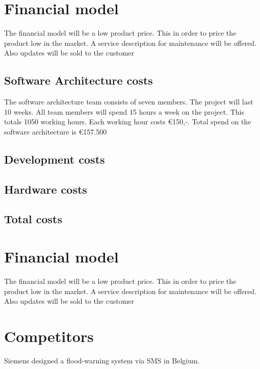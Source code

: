 \section{Financial model}
The financial model will be a low product price. This in order to price the product low in the market. A service description for maintenance will be offered. Also updates will be sold to the customer

\subsection{Software Architecture costs}
The software architecture team consists of seven members. The project will last 10 weeks. All team members will spend 15 hours a week on the project. This totals 1050 working hours. Each working hour costs €150,-. Total spend on the software architecture is €157.500
\subsection{Development costs}

\subsection{Hardware costs}

\subsection{Total costs}

\section{Financial model}
The financial model will be a low product price. This in order to price the product low in the market. A service description for maintenance will be offered. Also updates will be sold to the customer

\section{Competitors}
Siemens designed a flood-warning system via SMS in Belgium.

